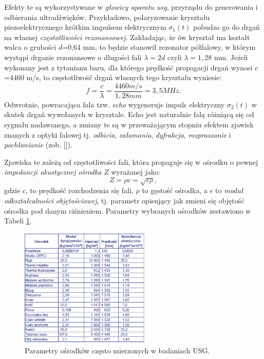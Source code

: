 Efekty te są wykorzystywane w \textit{głowicy aparatu usg}, przyrządu do generowania i odbierania ultradźwięków. Przykładowo, polaryzowanie kryształu piezoelektrycznego krótkim impulsem elektrycznym $\sigma_1(t)$ pobudza go do drgań na własnej \textit{częstotliwości rezonansowej}. Zakładając, że ów kryształ ma kształt walca o grubości $d$=0,64 mm, to będzie stanowił rezonator półfalowy, w którym wystąpi drganie rezonansowe o długości fali $\lambda = 2d$ czyli $\lambda = 1,28$ mm. Jeżeli wykonany jest z tytanianu baru, dla którego prędkość propagacji drgań wynosi $c$=4460 m/s, to częstotliwość drgań własnych tego kryształu wyniesie:
\begin{equation}
f = \frac{c}{\lambda} = \frac{4460 m/s}{1,28 mm} = 3,5 MHz.
\end{equation}
Odwrotnie, powracająca fala tzw. \textit{echo} wygeneruje impuls elektryczny $\sigma_2(t)$ w skutek drgań wywołanych w krysztale. Echo jest naturalnie falą różniącą się od sygnału nadawanego, a zmiany te są w przeważającym stopniu efektem zjawisk znanych z optyki falowej tj. \textit{odbicia}, \textit{załamania}, \textit{dyfrakcja}, \textit{rozpraszanie} i \textit{pochłanianie} (zob. []).

Zjawiska te zależą od częstotliwości fali, która propaguje się w ośrodku o pewnej \textit{impedancji akustycznej ośrodka} $Z$ wyrażanej jako:
\begin{equation}
Z = \rho c = \sqrt{\epsilon \rho},
\end{equation}
gdzie $c$, to prędkość rozchodzenia się fali, $\rho$ to gęstość ośrodka, a $\epsilon$ to \textit{moduł odkształcalności objętościowej}, tj. parametr opisujący jak zmieni się objętość ośrodka pod danym ciśnieniem. Parametry wybranych ośrodków zestawiono w Tabeli \ref{USG-params}. 
\begin{figure}[h!]
	\centering
	\includegraphics[width=0.55\textwidth]{figures/USG-params.png}
	\caption{Parametry ośrodków często mierzonych w badaniach USG.}
	\label{USG-params}
\end{figure}

